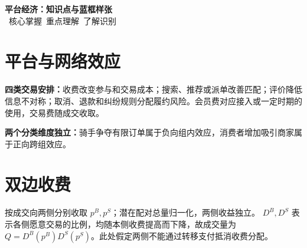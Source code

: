 \documentclass[12pt,a4paper,fontset=none]{ctexart}
\begin{document}
\begin{center}
{\LARGE\bfseries 平台经济：知识点与蓝框样张}\\[0.4ex]
{\small \PriorityMust\ 核心掌握\quad\PriorityImportant\ 重点理解\quad\PriorityKnow\ 了解识别}
\end{center}
\StudyDivider

\section{平台与网络效应}

\textbf{四类交易安排：}收费改变参与和交易成本；搜索、推荐或派单改善匹配；评价降低信息不对称；取消、退款和纠纷规则分配履约风险。会员费对应接入或一定时期的使用，交易费随成交收取。




\textbf{两个分类维度独立：}骑手争夺有限订单属于负向组内效应，消费者增加吸引商家属于正向跨组效应。


\section{双边收费}

按成交向两侧分别收取 $p^B,p^S$；潜在配对总量归一化，两侧收益独立。
$D^B,D^S$ 表示各侧愿意交易的比例，均随本侧收费提高而下降，故成交量为 $Q=D^B(p^B)D^S(p^S)$。此处假定两侧不能通过转移支付抵消收费分配。
\end{document}
